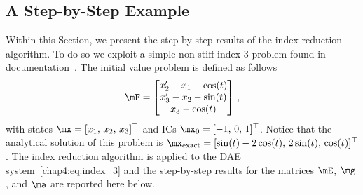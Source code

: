 \subsection{A Step-by-Step Example}
\label{chap4:sec:step_by_step}

Within this Section, we present the step-by-step results of the index reduction algorithm. To do so we exploit a simple non-stiff index-3 problem found in \Wolfram{}~\Mathematica{} documentation~\cite{mathematica}. The initial value problem is defined as follows
%
\begin{equation}
  \label{chap4:eq:index_3}
  \mF = \begin{bmatrix}
    x^{\prime}_{2} - x_{1} - \cos(t) \\
    x^{\prime}_{3} - x_{2} - \sin(t) \\
    x_{3} - \cos(t)
  \end{bmatrix} \, \text{,}
\end{equation}
%
with states $\mx = [x_{1}, \, x_{2}, \, x_{3}]^\top$ and \acp{IC} $\mx_{0} = [-1, \, 0, \, 1]^\top$. Notice that the analytical solution of this problem is $\mx_\text{exact} = [\sin(t) - 2\cos(t), \, 2\sin(t), \, \cos(t)]^\top$. The index reduction algorithm is applied to the \ac{DAE} system~\eqref{chap4:eq:index_3} and the step-by-step results for the matrices $\mE$, $\mg$, and $\ma$ are reported here below.
%
